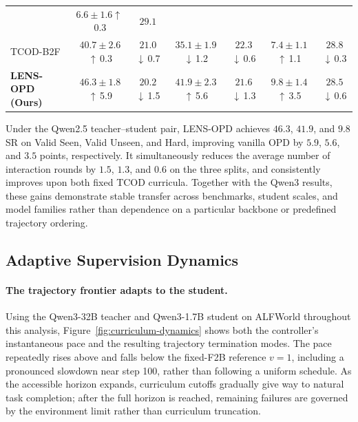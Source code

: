 \documentclass{article}
\newcommand{\gain}[1]{\textcolor{gainGreen}{\scriptsize$\uparrow$\,#1}}
\newcommand{\loss}[1]{\textcolor{lossRed}{\scriptsize$\downarrow$\,#1}}
\newcommand{\roundgain}[1]{\textcolor{gainGreen}{\scriptsize$\downarrow$\,#1}}
\begin{document}
\begin{table}[t]
{\begin{tabular}{lcccccc}
                              & $6.6\pm1.6$\gain{0.3} & $29.1$ \\
    TCOD-B2F                  & \cellcolor{secondSand}$40.7\pm2.6$\gain{0.3}
                              & \cellcolor{secondSand}$21.0$\roundgain{0.7}
                              & $35.1\pm1.9$\loss{1.2}
                              & \cellcolor{secondSand}$22.3$\roundgain{0.6}
                              & \cellcolor{secondSand}$7.4\pm1.1$\gain{1.1} & \cellcolor{secondSand}$28.8$\roundgain{0.3} \\
    \textbf{LENS-OPD (Ours)} & \cellcolor{bestLavender}$\mathbf{46.3\pm1.8}$\gain{5.9}
                              & \cellcolor{bestLavender}$\mathbf{20.2}$\roundgain{1.5}
                              & \cellcolor{bestLavender}$\mathbf{41.9\pm2.3}$\gain{5.6}
                              & \cellcolor{bestLavender}$\mathbf{21.6}$\roundgain{1.3}
                              & \cellcolor{bestLavender}$\mathbf{9.8\pm1.4}$\gain{3.5}
                              & \cellcolor{bestLavender}$\mathbf{28.5}$\roundgain{0.6} \\
    \bottomrule
  \end{tabular}%
  }
\end{table}

Under the Qwen2.5 teacher--student pair, LENS-OPD achieves $46.3$, $41.9$, and $9.8$ SR on Valid
Seen, Valid Unseen, and Hard, improving vanilla OPD by $5.9$, $5.6$, and $3.5$ points,
respectively.  It simultaneously reduces the average number of interaction rounds by $1.5$, $1.3$,
and $0.6$ on the three splits, and consistently improves upon both fixed TCOD curricula.  Together
with the Qwen3 results, these gains demonstrate stable transfer across benchmarks, student scales,
and model families rather than dependence on a particular backbone or predefined trajectory
ordering.

\subsection{Adaptive Supervision Dynamics}
\label{sec:adaptive-supervision-dynamics}

\paragraph{The trajectory frontier adapts to the student.}
Using the Qwen3-32B teacher and Qwen3-1.7B student on ALFWorld throughout this analysis,
Figure~\ref{fig:curriculum-dynamics} shows both the controller's instantaneous pace and the resulting
trajectory termination modes.  The pace repeatedly rises above and falls below the fixed-F2B
reference $v=1$, including a pronounced slowdown near step 100, rather than following a uniform
schedule.  As the accessible horizon expands, curriculum cutoffs gradually give way to natural task
completion; after the full horizon is reached, remaining failures are governed by the environment
limit rather than curriculum truncation.
\end{document}
